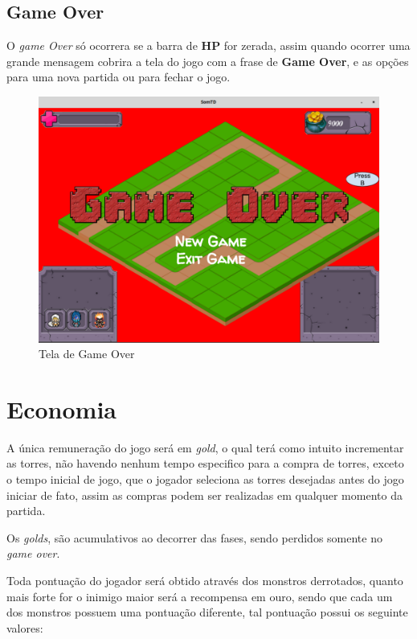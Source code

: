 \documentclass[11pt]{article} %
\begin{document}
\subsection{Game Over}
O \textit{game Over} só ocorrera se a barra de \textbf{HP} for zerada, assim quando ocorrer uma grande mensagem cobrira a tela do jogo com a frase de \textbf{Game Over}, e as opções para uma nova partida ou para fechar o jogo.

\begin{figure}[!htp]
\centering
\includegraphics[scale=0.3]{res/game_over.png}
\caption{Tela de Game Over}
\label{Game Over}
\end{figure}
\newpage

\section{Economia}

A única remuneração do jogo será em \textit{gold}, o qual terá como intuito incrementar as torres, não havendo nenhum tempo especifico para a compra de torres, exceto o tempo inicial de jogo, que o jogador seleciona as torres desejadas antes do jogo iniciar de fato, assim as compras podem ser realizadas em qualquer momento da partida.

Os \textit{golds}, são acumulativos ao decorrer das fases, sendo perdidos somente no \textit{game over}.

Toda pontuação do jogador será obtido através dos monstros derrotados, quanto mais forte for o inimigo  maior será a recompensa em ouro, sendo que cada um dos monstros possuem uma pontuação diferente, tal pontuação possui os seguinte valores:
\end{document}
